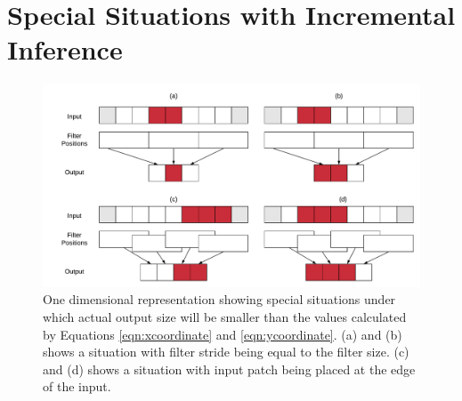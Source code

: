 \appendix

\section{Special Situations with Incremental Inference}

\begin{figure}[t]
\includegraphics[width=\columnwidth]{images/less_one_example}
\caption{One dimensional representation showing special situations under which actual output size will be smaller than the values calculated by Equations \ref{eqn:xcoordinate} and \ref{eqn:ycoordinate}. (a) and (b) shows a situation with filter stride being equal to the filter size. (c) and (d) shows a situation with input patch being placed at the edge of the input.}
\label{fig:less_one_example}
\end{figure}

